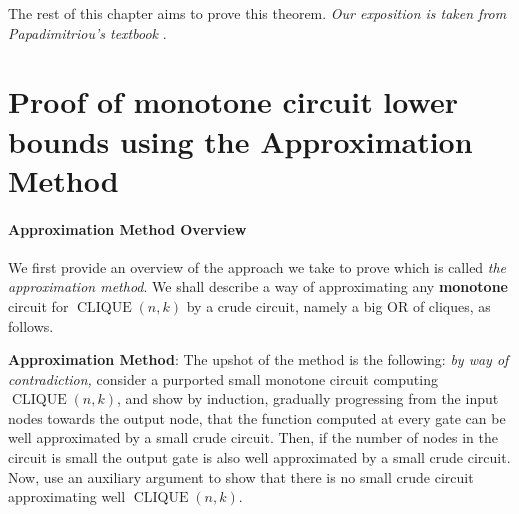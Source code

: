 The rest of this chapter aims to prove this theorem. \textit{Our exposition is taken from Papadimitriou's textbook} \cite{Pap94}.






\section{Proof of monotone circuit lower bounds  using the Approximation Method}


\paragraph{Approximation Method Overview}

We first provide an overview of the approach we take to prove  which is called \emph{the approximation method}. 
We shall describe a way of approximating any \textbf{monotone} circuit for $\operatorname{CLIQUE}({n}, {k})$ by a crude circuit, namely a big OR of cliques, as follows.
 

\begin{tcolorbox}[colframe=white, colback=blue!5, boxrule=0mm, sharp corners]
\textbf{Approximation Method}:
The upshot of the method is the following: \emph{by  way of contradiction,} consider a purported small monotone circuit computing  $\operatorname{CLIQUE}({n}, {k})$, and show by induction, gradually progressing from the input nodes towards the output node, that the function computed at every gate can be well approximated by a small crude circuit. Then, if the number of nodes in the circuit is small the output gate is also well approximated by a small crude circuit. Now, use an auxiliary argument to show that there is no small crude circuit approximating well  $\operatorname{CLIQUE}({n}, {k})$.
\end{tcolorbox}

